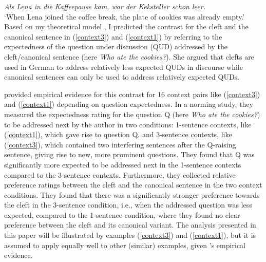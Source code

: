 \documentclass[output=paper,colorlinks,citecolor=brown]{langscibook}
\begin{document}
\ea\label{context1}\textit{Als Lena in die Kaffeepause kam, war der Keksteller schon leer.}\\
`When Lena joined the coffee break, the plate of cookies was already empty.'
\label{can_2}
\label{cleft_2}
\z
\z
%
Based on my theoretical model \citep{tonnis_2021}, I predicted the contrast for the cleft and the canonical sentence in (\ref{context3}) and (\ref{context1}) by referring to the expectedness of the question under discussion (QUD) \citep{roberts_2012} addressed by the cleft/canonical sentence (here \textit{Who ate the cookies?}). She argued that clefts are used in German to address relatively less expected QUDs in discourse while canonical sentences can only be used to address relatively expected QUDs. 

\citet{tonnis_tonhauser_2022} provided empirical evidence for this contrast for 16 context pairs like (\ref{context3}) and (\ref{context1}) depending on question expectedness. In a norming study, they measured the expectedness rating for the question Q (here \textit{Who ate the cookies?}) to be addressed next by the author in two conditions: 1-sentence contexts, like (\ref{context1}), which gave rise to question Q, and 3-sentence contexts, like (\ref{context3}), which contained two interfering sentences after the Q-raising sentence, giving rise to new, more prominent questions. They found that Q was significantly more expected to be addressed next in the 1-sentence contexts compared to the 3-sentence contexts. Furthermore, they collected relative preference ratings between the cleft and the canonical sentence in the two context conditions. They found that there was a significantly stronger preference towards the cleft in the 3-sentence condition, i.e., when the addressed question was less expected, compared to the 1-sentence condition, where they found no clear preference between the cleft and its canonical variant. The analysis presented in this paper will be illustrated by examples (\ref{context3}) and (\ref{context1}), but it is assumed to apply equally well to other (similar) examples, given \citeauthor{tonnis_tonhauser_2022}'s empirical evidence.
\end{document}
